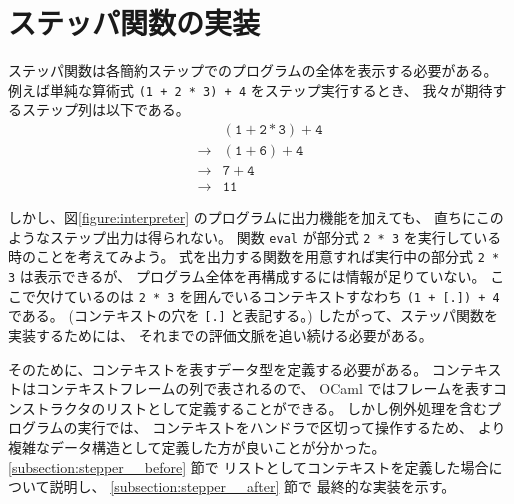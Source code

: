 \section{ステッパ関数の実装}
\label{section:try-with__stepper}

ステッパ関数は各簡約ステップでのプログラムの全体を表示する必要がある。
例えば単純な算術式 \texttt{(1 + 2 * 3) + 4} をステップ実行するとき、
我々が期待するステップ列は以下である。
\[
\begin{array}{cl}
            & \mathtt{(1 + 2 * 3) + 4} \\
\rightarrow & \mathtt{(1 + 6) + 4} \\
\rightarrow & \mathtt{7 + 4} \\
\rightarrow & \mathtt{11}
\end{array}
\]

しかし、図\ref{figure:interpreter} のプログラムに出力機能を加えても、
直ちにこのようなステップ出力は得られない。
関数 \texttt{eval} が部分式 \texttt{2 * 3} を実行している時のことを考えてみよう。
式を出力する関数を用意すれば実行中の部分式 \texttt{2 * 3} は表示できるが、
プログラム全体を再構成するには情報が足りていない。
ここで欠けているのは \texttt{2 * 3} を囲んでいるコンテキストすなわち
\texttt{(1 + [.])\ + 4} である。
(コンテキストの穴を \texttt{[.]} と表記する。)
したがって、ステッパ関数を実装するためには、
それまでの評価文脈を追い続ける必要がある。

そのために、コンテキストを表すデータ型を定義する必要がある。
コンテキストはコンテキストフレームの列で表されるので、
OCaml ではフレームを表すコンストラクタのリストとして定義することができる。
しかし例外処理を含むプログラムの実行では、
コンテキストをハンドラで区切って操作するため、
より複雑なデータ構造として定義した方が良いことが分かった。
\ref{subsection:stepper__before} 節で
リストとしてコンテキストを定義した場合について説明し、
\ref{subsection:stepper__after} 節で
最終的な実装を示す。

